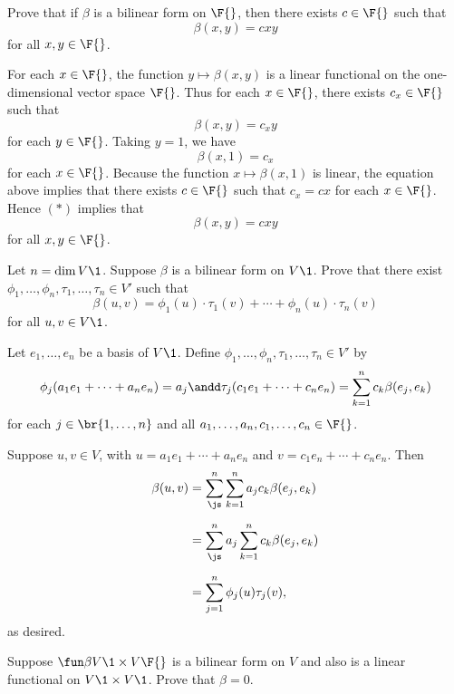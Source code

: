 
\exercise
Prove that if $\beta$ is a bilinear form on $\F{}$, then there exists $c \in \F{}$ such that
\[
\beta(x,y) = c x y
\]
for all $x, y \in \F{}$.

\begin{Solution}
For each $x \in \F{}$, the function $y \mapsto \beta(x,y)$ is a linear functional on the one-dimensional vector space $\F{}$. Thus for each $x \in \F{}$, there exists $c_x \in \F{}$ such that
\[ \tag{$(*)$}
\beta(x,y) = c_x y
\]
for each $y \in \F{}$. Taking $y = 1$, we have
\[
\beta(x, 1) = c_x
\]
for each $x \in \F{}$. Because the function $x \mapsto \beta(x,1)$ is linear, the equation above implies that there exists $c \in \F{}$ such that $c_x = cx$ for each $x \in \F{}$. Hence $(*)$ implies that
\[
\beta(x,y) = c x y
\]
for all $x, y \in \F{}$.
\end{Solution}

\exercise
Let $n = \dim V\1$. Suppose $\beta$ is a bilinear form on $V\1$. Prove that there exist
$\phi_1, \ldots, \phi_n, \tau_1, \ldots, \tau_n \in V'\!$ such that
\[
\beta(u, v) = \phi_1(u) \cdot \tau_1(v) + \cdots + \phi_n(u) \cdot \tau_n(v)
\]
for all $u, v \in V\1$.

\begin{Solution}
Let $e_1, \ldots, e_n$ be a basis of $V\1$. Define $\phi_1, \ldots, \phi_n, \tau_1, \ldots, \tau_n \in V'$ by
\[
\phi_j( a_1 e_1 + \cdots + a_n e_n ) = a_j
\andd
\tau_j( c_1 e_1 + \cdots + c_n e_n ) = \sum_{k=1}^n c_k \beta(e_j, e_k)
\]
for each $j \in \br{1, \ldots, n}$ and all $a_1, \ldots, a_n, c_1, \ldots, c_n \in \F{}$.

Suppose $u, v \in V$, with $u = a_1 e_1 + \cdots + a_n e_n$ and $v = c_1 e_n + \cdots + c_n e_n$. Then
\begin{align*}
\beta(u, v) &= \sum_{\js}^n \sum_{k=1}^n a_j c_k \beta(e_j, e_k) \\[6bp]
&= \sum_{\js}^n a_j \sum_{k=1}^n c_k \beta(e_j, e_k) \\[6bp]
&= \sum_{j=1}^n \phi_j(u) \tau_j(v),
 \end{align*}
 as desired.
\end{Solution}

\exercise
Suppose $\fun \beta {V\1 \times V} {\F{}}$ is a bilinear form on $V$ and also is a linear functional on $V\1 \times V\1$. Prove that
$\beta = 0$.\label{11zero}

